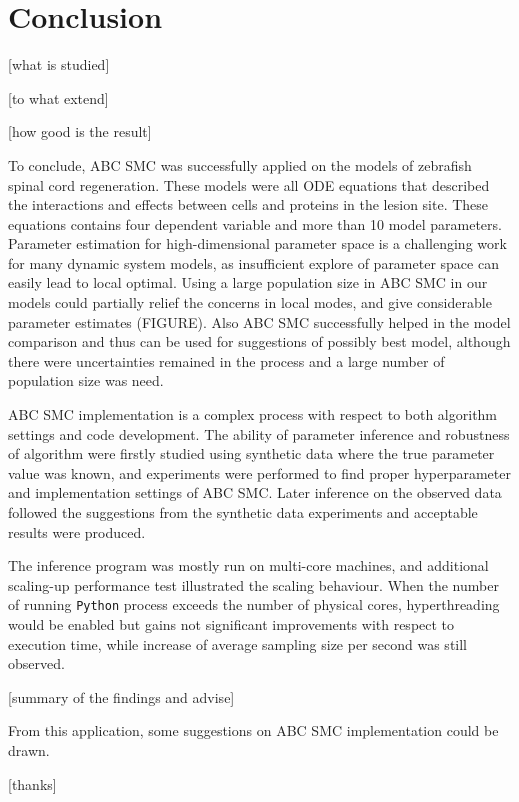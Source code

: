 \chapter{Conclusion}

 [what is studied]

 [to what extend]

 [how good is the result]

 To conclude, ABC SMC was successfully applied on the models of zebrafish spinal cord regeneration. These models were all ODE equations that described the interactions and effects between cells and proteins in the lesion site. These equations contains four dependent variable and more than 10 model parameters.  Parameter estimation for high-dimensional parameter space is a challenging work for many dynamic system models, as insufficient explore of parameter space can easily lead to local optimal. Using a large population size in ABC SMC in our models could partially relief the concerns in local modes, and give considerable parameter estimates (FIGURE). Also ABC SMC successfully helped in the model comparison and thus can be used for suggestions of possibly best model, although there were uncertainties remained in the process and a large number of population size was need.

 ABC SMC implementation is a complex process with respect to both algorithm settings and code development. The ability of parameter inference and robustness of algorithm were firstly studied using synthetic data where the true parameter value was known, and experiments were performed to find proper hyperparameter and implementation settings of ABC SMC. Later inference on the observed data followed the suggestions from the synthetic data experiments and acceptable results were produced.

 The inference program was mostly run on multi-core machines, and additional scaling-up performance test illustrated the scaling behaviour. When the number of running \verb|Python| process exceeds the number of physical cores, hyperthreading would be enabled but gains not significant improvements with respect to execution time, while increase of average sampling size per second was still observed.

 [summary of the findings and advise]

 From this application, some suggestions on ABC SMC implementation could be drawn.

 [thanks]